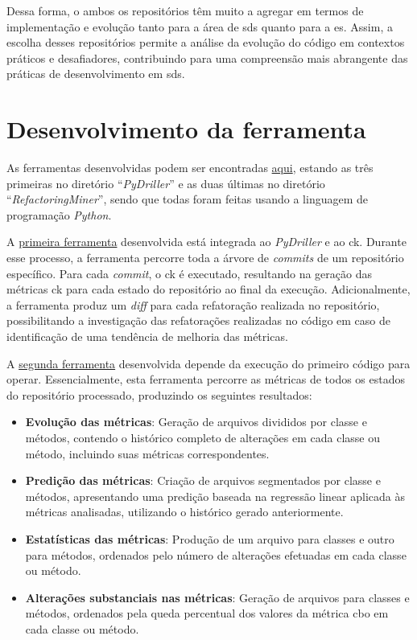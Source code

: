 Dessa forma, o ambos os repositórios têm muito a agregar em termos de implementação e evolução tanto para a área de \gls{sds} quanto para a \gls{es}. Assim, a escolha desses repositórios permite a análise da evolução do código em contextos práticos e desafiadores, contribuindo para uma compreensão mais abrangente das práticas de desenvolvimento em \gls{sds}.

\section{Desenvolvimento da ferramenta}
As ferramentas desenvolvidas podem ser encontradas \href{https://github.com/BrenoFariasdaSilva/Scientific-Research}{aqui}, estando as três primeiras no diretório ``\textit{PyDriller}'' e as duas últimas no diretório ``\textit{RefactoringMiner}'', sendo que todas foram feitas usando a linguagem de programação \textit{Python}.

A \href{https://github.com/BrenoFariasdaSilva/Scientific-Research/blob/main/PyDriller/metrics_changes.py}{primeira ferramenta} desenvolvida está integrada ao \textit{PyDriller} e ao \gls{ck}. Durante esse processo, a ferramenta percorre toda a árvore de \textit{commits} de um repositório específico. Para cada \textit{commit}, o \gls{ck} é executado, resultando na geração das métricas \gls{ck} para cada estado do repositório ao final da execução. Adicionalmente, a ferramenta produz um \textit{diff} para cada refatoração realizada no repositório, possibilitando a investigação das refatorações realizadas no código em caso de identificação de uma tendência de melhoria das métricas.

A \href{https://github.com/BrenoFariasdaSilva/Scientific-Research/blob/main/PyDriller/metrics_changes.py}{segunda ferramenta} desenvolvida depende da execução do primeiro código para operar. Essencialmente, esta ferramenta percorre as métricas de todos os estados do repositório processado, produzindo os seguintes resultados:

\begin{itemize}
    \item \textbf{Evolução das métricas}: Geração de arquivos divididos por classe e métodos, contendo o histórico completo de alterações em cada classe ou método, incluindo suas métricas correspondentes.
    \item \textbf{Predição das métricas}: Criação de arquivos segmentados por classe e métodos, apresentando uma predição baseada na regressão linear aplicada às métricas analisadas, utilizando o histórico gerado anteriormente.
    \item \textbf{Estatísticas das métricas}: Produção de um arquivo para classes e outro para métodos, ordenados pelo número de alterações efetuadas em cada classe ou método.
    \item \textbf{Alterações substanciais nas métricas}: Geração de arquivos para classes e métodos, ordenados pela queda percentual dos valores da métrica \gls{cbo} em cada classe ou método.
\end{itemize}

